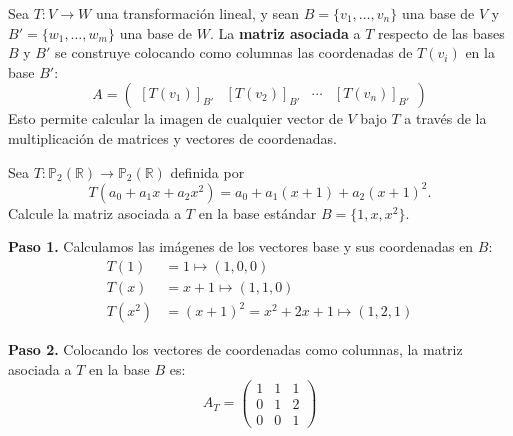 \begin{rem}
Sea $T: V \to W$ una transformación lineal, y sean $B = \{v_1, \ldots, v_n\}$ una base de $V$ y $B' = \{w_1, \ldots, w_m\}$ una base de $W$. La \textbf{matriz asociada} a $T$ respecto de las bases $B$ y $B'$ se construye colocando como columnas las coordenadas de $T(v_i)$ en la base $B'$:
\[
A = \begin{pmatrix}
\left[ T(v_1) \right]_{B'} & \left[ T(v_2) \right]_{B'} & \cdots & \left[ T(v_n) \right]_{B'}
\end{pmatrix}
\]
Esto permite calcular la imagen de cualquier vector de $V$ bajo $T$ a través de la multiplicación de matrices y vectores de coordenadas.
\end{rem}

\begin{example}
Sea $T: \mathbb{P}_2(\mathbb{R}) \to \mathbb{P}_2(\mathbb{R})$ definida por
\[
T\left(a_0 + a_1 x + a_2 x^2\right) = a_0 + a_1(x+1) + a_2(x+1)^2.
\]
Calcule la matriz asociada a $T$ en la base estándar $B = \{1, x, x^2\}$.
\begin{myproof}
\textbf{Paso 1.} Calculamos las imágenes de los vectores base y sus coordenadas en $B$:
\begin{align*}
T(1) &= 1 \mapsto (1, 0, 0) \\
T(x) &= x+1 \mapsto (1, 1, 0) \\
T(x^2) &= (x+1)^2 = x^2 + 2x + 1 \mapsto (1, 2, 1)
\end{align*}

\textbf{Paso 2.} Colocando los vectores de coordenadas como columnas, la matriz asociada a $T$ en la base $B$ es:
\[
\boxed{A_T = \begin{pmatrix}
1 & 1 & 1 \\
0 & 1 & 2 \\
0 & 0 & 1
\end{pmatrix}}
\]
\end{myproof}
\end{example}

